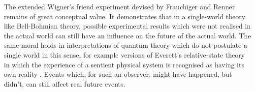 \documentclass[12pt,reqno]{article}
\newcommand{\ok}{\text{ok}}
\renewcommand{\(}{\left(}
\renewcommand{\)}{\right)}
\renewcommand{\.}{\centerdot}
\newcommand{\1}{\mathbf{1}}
\newcommand{\<}{\langle}
\renewcommand{\>}{\rangle}
\newcommand{\FR}{Frauchiger and Renner}
\theoremstyle{definition}
\theoremstyle{remark}
\numberwithin{equation}{section}
\begin{document}



%

The extended Wigner's friend experiment devised by Frauchiger and Renner remains of great conceptual value. It demonstrates that in a single-world theory like Bell-Bohmian theory, possible experimental results which were not realised in the actual world can still have an influence on the future of the actual world. The same moral holds in interpretations of quantum theory which do not postulate a single world in this sense, for example versions of Everett's relative-state theory in which the experience of a sentient physical system is recognised as having its own reality \cite{verdammte}. Events which, for such an observer, might have happened, but didn't, can still affect real future events.
\end{document}
